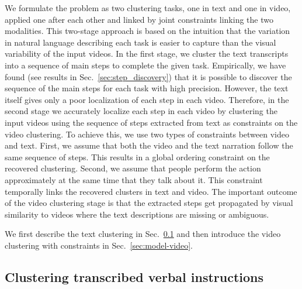 \documentclass[10pt,twocolumn,letterpaper]{article}
\begin{document}
We formulate the problem as two clustering tasks, one in text and one in video, applied one after each other and linked by joint constraints linking the two modalities.
  This two-stage approach is based on the intuition that the variation in natural language describing each task is easier to capture than the visual variability of the input videos. 
 In the first stage, we cluster the text transcripts into a sequence of  main steps to complete the given task.  Empirically, we have found (see results in Sec.~\ref{sec:step_discovery}) that it is possible to discover the sequence of the  main steps for each task with high precision. However, the text itself gives only a poor localization of each step in each video. 
 Therefore, in the second stage we accurately localize each step in each video by clustering the input videos using the sequence of  steps extracted from text as constraints on the video clustering. 
To achieve this, we use two types of constraints between video and text.  First, we assume that both the video and the text narration follow the same sequence of steps. This results in a global ordering constraint on the recovered clustering. Second, we assume that people perform the action approximately at the same time that they talk about it. This constraint temporally links the recovered clusters in text and video. The important outcome of the video clustering stage is that the  extracted steps get propagated by visual similarity to videos where the text descriptions are missing or ambiguous. 

We first describe the text clustering in Sec.~\ref{subsec:model_text} and then introduce the video clustering with constraints in Sec.~\ref{sec:model-video}.













\subsection{Clustering transcribed verbal instructions}
\label{subsec:model_text}
\label{sec:text}
\end{document}
